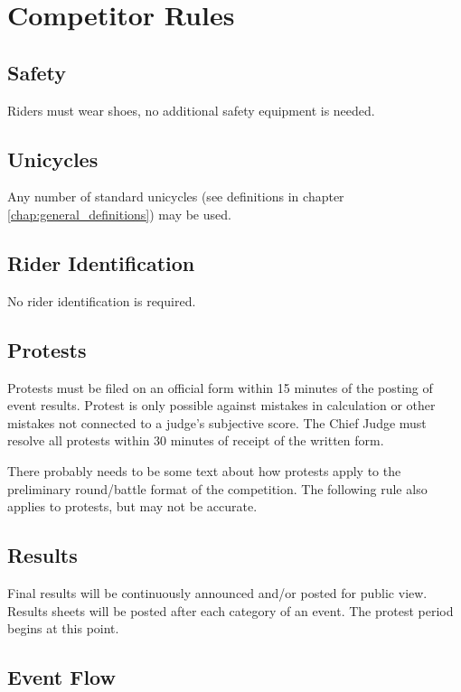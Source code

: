 \chapter{Competitor Rules}

\section{Safety}

Riders must wear shoes, no additional safety equipment is needed.

\section{Unicycles}

Any number of standard unicycles (see definitions in chapter \ref{chap:general_definitions}) may be used.

\section{Rider Identification}

No rider identification is required.

\section{Protests}

Protests must be filed on an official form within 15 minutes of the posting of event results.
Protest is only possible against mistakes in calculation or other mistakes not connected to a judge's subjective score.
The Chief Judge must resolve all protests within 30 minutes of receipt of the written form.

\begin{comment2016}
There probably needs to be some text about how protests apply to the preliminary round/battle format of the competition.
The following rule also applies to protests, but may not be accurate.
\end{comment2016}

\section{Results}
Final results will be continuously announced and/or posted for public view.
Results sheets will be posted after each category of an event.
The protest period begins at this point.

\section{Event Flow}

